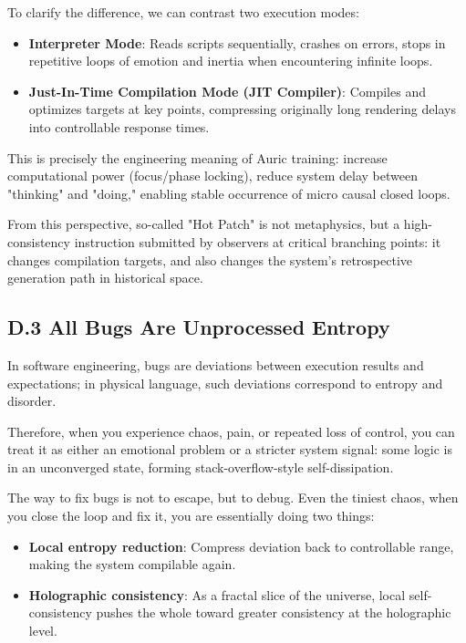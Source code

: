 To clarify the difference, we can contrast two execution modes:

\begin{itemize}
\item \textbf{Interpreter Mode}: Reads scripts sequentially, crashes on errors, stops in repetitive loops of emotion and inertia when encountering infinite loops.
\item \textbf{Just-In-Time Compilation Mode (JIT Compiler)}: Compiles and optimizes targets at key points, compressing originally long rendering delays into controllable response times.
\end{itemize}

This is precisely the engineering meaning of Auric training: increase computational power (focus/phase locking), reduce system delay between "thinking" and "doing," enabling stable occurrence of micro causal closed loops.

From this perspective, so-called "Hot Patch" is not metaphysics, but a high-consistency instruction submitted by observers at critical branching points: it changes compilation targets, and also changes the system's retrospective generation path in historical space.

\subsection*{D.3 All Bugs Are Unprocessed Entropy}

In software engineering, bugs are deviations between execution results and expectations; in physical language, such deviations correspond to entropy and disorder.

Therefore, when you experience chaos, pain, or repeated loss of control, you can treat it as either an emotional problem or a stricter system signal: some logic is in an unconverged state, forming stack-overflow-style self-dissipation.

The way to fix bugs is not to escape, but to debug. Even the tiniest chaos, when you close the loop and fix it, you are essentially doing two things:

\begin{itemize}
\item \textbf{Local entropy reduction}: Compress deviation back to controllable range, making the system compilable again.
\item \textbf{Holographic consistency}: As a fractal slice of the universe, local self-consistency pushes the whole toward greater consistency at the holographic level.
\end{itemize}

